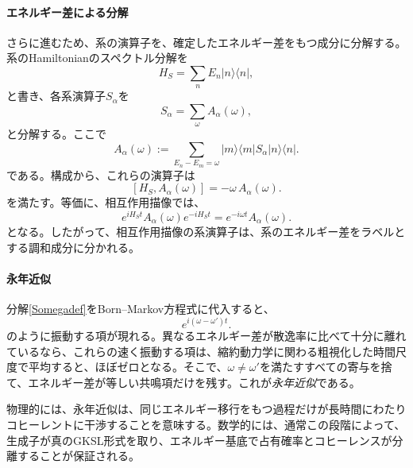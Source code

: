 \documentclass[a4paper,11pt,oneside]{article}
\theoremstyle{definition}
\numberwithin{equation}{section}
\begin{document}
\paragraph{エネルギー差による分解}



さらに進むため、系の演算子を、確定したエネルギー差をもつ成分に分解する。系のHamiltonianのスペクトル分解を
\begin{equation}
H_S = \sum_n E_n |n\rangle\langle n| ,
\end{equation}
と書き、各系演算子$S_\alpha$を
\begin{equation}\label{Somegadef}
S_\alpha = \sum_\omega A_\alpha(\omega) ,
\end{equation}
と分解する。ここで
\begin{equation}\label{Aomegadef}
A_\alpha(\omega)
:=
\sum_{E_n-E_m=\omega}
|m\rangle\langle m|S_\alpha|n\rangle\langle n| .
\end{equation}
である。構成から、これらの演算子は
\begin{equation}\label{definitebohr}
[H_S,A_\alpha(\omega)] = -\omega\,A_\alpha(\omega) .
\end{equation}
を満たす。等価に、相互作用描像では、
\begin{equation}
e^{iH_S t}A_\alpha(\omega)e^{-iH_S t}
=
e^{-i\omega t}A_\alpha(\omega) .
\end{equation}
となる。したがって、相互作用描像の系演算子は、系のエネルギー差をラベルとする調和成分に分かれる。



\paragraph{永年近似}



分解\eqref{Somegadef}をBorn--Markov方程式に代入すると、
\begin{equation}\label{secularapprox}
e^{i(\omega-\omega')t} .
\end{equation}
のように振動する項が現れる。異なるエネルギー差が散逸率に比べて十分に離れているなら、これらの速く振動する項は、縮約動力学に関わる粗視化した時間尺度で平均すると、ほぼゼロとなる。そこで、$\omega\neq\omega'$を満たすすべての寄与を捨て、エネルギー差が等しい共鳴項だけを残す。これが\textit{永年近似}である。



物理的には、永年近似は、同じエネルギー移行をもつ過程だけが長時間にわたりコヒーレントに干渉することを意味する。数学的には、通常この段階によって、生成子が真のGKSL形式を取り、エネルギー基底で占有確率とコヒーレンスが分離することが保証される。
\end{document}
